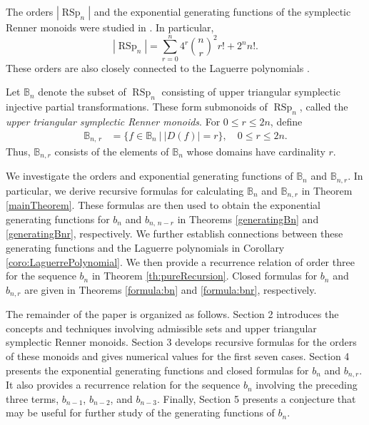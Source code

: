 \documentclass[11pt]{article}
\newcommand{\q}{\quad}
\newcommand{\les}{\leqslant}
\DeclareMathOperator{\RSp}{RSp}
\begin{document}
The orders $|\RSp_n|$ and the exponential generating functions of the symplectic Renner monoids were studied in \cite{LLC}. In particular,
$$
  |\RSp_n|   = \sum_{r=0}^n 4^r{\binom nr}^2 r! + 2^n n!.
$$
These orders are also closely connected to the Laguerre polynomials \cite{LLC}. 


Let $\mathbb B_n$ denote the subset of $\RSp_n$ consisting of upper triangular symplectic injective partial transformations. These form submonoids of $\RSp_n$, called the {\em upper triangular symplectic Renner monoids}. For $0\leq r\leq2n$, define
\begin{align*}
\mathbb B_{n,\,r}&=\{ f\in \mathbb B_n ~\big|~|D(f)|=r\},\q 0\les r\les 2n.
\end{align*}
Thus, $\mathbb B_{n,r}$ consists of the elements of $\mathbb B_n$ whose domains have cardinality $r$.

We investigate the orders and exponential generating functions of $\mathbb B_n$ and $\mathbb B_{n,r}$. In particular, we derive recursive formulas for calculating $\mathbb B_n$ and $\mathbb B_{n,r}$ in Theorem \ref{mainTheorem}. These formulas are then used to obtain the exponential generating functions for $b_n$ and $b_{n,\,n-r}$ in Theorems \ref{generatingBn} and \ref{generatingBnr}, respectively. We further establish connections between these generating functions and the Laguerre polynomials in Corollary \ref{coro:LaguerrePolynomial}. We then provide a recurrence relation of order three for the sequence $b_n$ in Theorem \ref{th:pureRecursion}. Closed formulas for $b_n$ and $b_{n,r}$ are given in Theorems \ref{formula:bn} and \ref{formula:bnr}, respectively.

The remainder of the paper is organized as follows. Section 2 introduces the concepts and techniques involving admissible sets and upper triangular symplectic Renner monoids. Section 3 develops recursive formulas for the orders of these monoids and gives numerical values for the first seven cases. Section 4 presents the exponential generating functions and closed formulas for $b_n$ and $b_{n,r}$. It also provides a recurrence relation for the sequence $b_n$ involving the preceding three terms, $b_{n-1}$, $b_{n-2}$, and $b_{n-3}$. Finally, Section 5 presents a conjecture that may be useful for further study of the generating functions of $b_n$.
\end{document}
